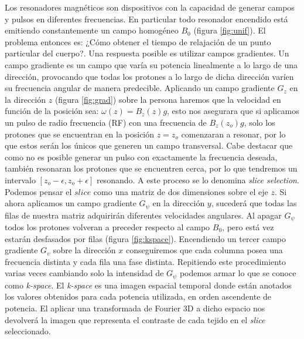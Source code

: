 Los resonadores magn\'eticos son dispositivos con la capacidad de generar 
campos y pulsos en diferentes frecuencias. En particular todo resonador
encendido est\'a emitiendo constantemente un campo homog\'eneo $B_0$
(figura \ref{fig:unif}). El problema entonces es: ¿C\'omo obtener el tiempo
de relajaci\'on de un punto particular del cuerpo?. Una respuesta posible
es utilizar campos gradientes. Un campo gradiente es un campo que var\'ia
su potencia linealmente a lo largo de una direcci\'on, provocando que todas
los protones a lo largo de dicha direcci\'on var\'ien su frecuencia
angular de manera predecible. Aplicando un campo gradiente $G_z$ en la
direcci\'on $z$ (figura \ref{fig:grad}) sobre la persona haremos que la
velocidad en funci\'on de la posici\'on sea: $\omega(z) = B_z(z) g$, esto
nos asegurara que si aplicamos un pulso de radio frecuencia (RF) con una
frecuencia de $B_z(z_o) g$, solo los protones que se encuentran en la
posici\'on $z=z_o$ comenzaran a resonar, por lo que estos ser\'an los
\'unicos que generen un campo transversal. Cabe destacar que como no es
posible generar un pulso con exactamente la frecuencia deseada, tambi\'en
resonaran los protones que se encuentren cerca, por lo que tendremos un
intervalo $[z_o-\epsilon,z_o+\epsilon]$ resonando. A este proceso se lo
denomina \textit{slice selection}. Podemos pensar el $slice$ como una
matriz
de dos dimensiones sobre el eje $z$. Si ahora aplicamos un campo gradiente
$G_\psi$ en la direcci\'on $y$, suceder\'a que todas las  filas de nuestra
matriz adquirir\'an diferentes velocidades angulares. Al apagar $G_\psi$
todos los protones volveran a preceder respecto al campo $B_0$, pero est\'a
vez estar\'an desfasados por filas (figura \ref{fig:kspace}). Encendiendo 
un tercer campo gradiente $G_\upsilon$ sobre la direcci\'on $x$
conseguiremos que cada columna posea una frecuencia distinta y cada fila
una fase distinta. Repitiendo este procedimiento varias veces cambiando
solo la intensidad de $G_\psi$ podemos armar lo que se conoce como 
\textit{k-space}. El \textit{k-space} es una imagen espacial temporal
donde est\'an anotados los valores obtenidos para cada potencia utilizada,
en orden ascendente de potencia. El aplicar una transformada de Fourier 3D
a dicho espacio nos devolver\'a la imagen que representa el contraste de
cada tejido en el \textit{slice} seleccionado. \\

